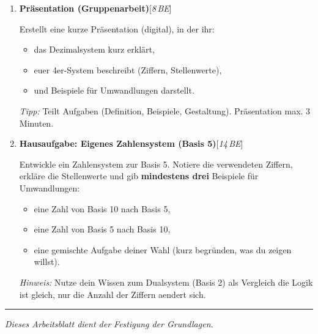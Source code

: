 \documentclass[11pt,a4paper]{scrartcl}
\newenvironment{aufgaben}{%
	\begin{enumerate}[leftmargin=*,label=\textbf{Aufgabe~\arabic*:}]}
	{\end{enumerate}}
\newcommand{\punkte}[1]{\hfill{\small[\textit{#1\,BE}]}}
\begin{document}
\begin{aufgaben}
		\item \textbf{Präsentation (Gruppenarbeit)}\punkte{8}
		
		Erstellt eine kurze Präsentation (digital), in der ihr:
		\begin{itemize}[leftmargin=*]
			\item das Dezimalsystem kurz erklärt,
			\item euer 4er-System beschreibt (Ziffern, Stellenwerte),
			\item und Beispiele für Umwandlungen darstellt.
		\end{itemize}
		\textit{Tipp:} Teilt Aufgaben (Definition, Beispiele, Gestaltung). Präsentation max. 3\,Minuten.
		
		\vspace{0.2cm}
		
		\item \textbf{Hausaufgabe: Eigenes Zahlensystem (Basis 5)}\punkte{14}
		
		Entwickle ein Zahlensystem zur Basis 5. Notiere die verwendeten Ziffern, erkläre die Stellenwerte und gib \textbf{mindestens drei} Beispiele für Umwandlungen:
		\begin{itemize}[leftmargin=*]
			\item eine Zahl von Basis 10 nach Basis 5,
			\item eine Zahl von Basis 5 nach Basis 10,
			\item eine gemischte Aufgabe deiner Wahl (kurz begründen, was du zeigen willst).
		\end{itemize}
		\textit{Hinweis:} Nutze dein Wissen zum Dualsystem (Basis 2) als Vergleich \textemdash die Logik ist gleich, nur die Anzahl der Ziffern aendert sich.
		
	\end{aufgaben}
	
	\vfill
	\hrule
	\small\emph{Dieses Arbeitsblatt dient der Festigung der Grundlagen.}
	
\end{document}
